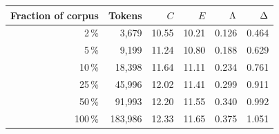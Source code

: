 \begin{tabular}{@{}r r r r r r@{}}
\toprule
Fraction of corpus & Tokens & $C$ & $E$ & $\Lambda$ & $\Delta$ \\
\midrule
2\,\% & 3{,}679 & 10.55 & 10.21 & 0.126 & 0.464 \\
5\,\% & 9{,}199 & 11.24 & 10.80 & 0.188 & 0.629 \\
10\,\% & 18{,}398 & 11.64 & 11.11 & 0.234 & 0.761 \\
25\,\% & 45{,}996 & 12.02 & 11.41 & 0.299 & 0.911 \\
50\,\% & 91{,}993 & 12.20 & 11.55 & 0.340 & 0.992 \\
100\,\% & 183{,}986 & 12.33 & 11.65 & 0.375 & 1.051 \\
\bottomrule
\end{tabular}